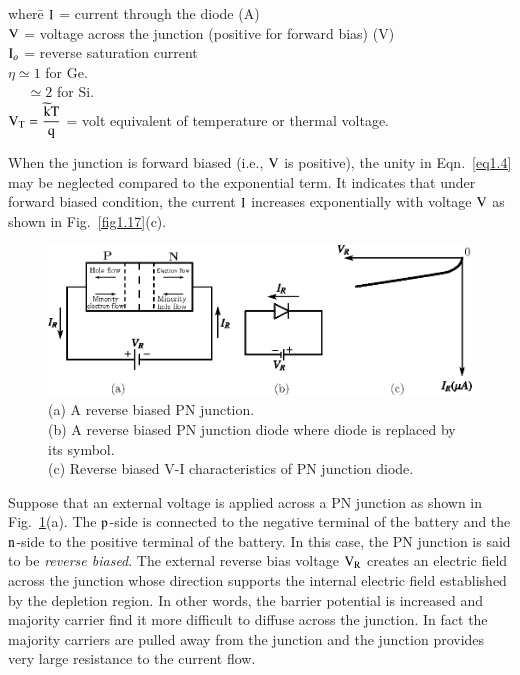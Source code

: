 \noindent
\begin{tabbing}
where\quad \= $\textrm{I}$ = current through the diode (A)\\[3pt]
           \> $\textrm{V}$ = voltage across the junction (positive for forward bias) (V)\\[3pt]
           \> $\textrm{I}_{o}$ = reverse saturation current\\[3pt]
           \> $\eta\simeq 1$ for Ge.\\[3pt]
           \> ~~ $\simeq 2$ for Si.\\[3pt]
           \> $\textrm{V}_{\textrm{T}}=\dfrac{\widetilde{\textrm{k}}\textrm{T}}{\textrm{q}}$ = volt equivalent of temperature or thermal voltage.
\end{tabbing}

When the junction is forward biased (i.e., $\textrm{V}$ is positive), the unity in Eqn.~\ref{eq1.4} may be neglected compared to the exponential term. It indicates that under forward biased condition, the current $\textrm{I}$ increases exponentially with voltage $\textrm{V}$ as shown in Fig.~\ref{fig1.17}(c).

\smallskip
{}
\begin{figure}[H]
\centering
\includegraphics{chap1/fig1.18.eps}
\caption{(a) A reverse biased PN junction.\\ (b) A reverse biased PN junction diode where diode is replaced by its symbol.\\ (c) Reverse biased V-I characteristics of PN junction diode.}\label{fig1.18}
\end{figure}

Suppose that an external voltage is applied across a PN junction as shown in Fig.~\ref{fig1.18}(a). The $\textrm{p}$-side is connected to the negative terminal of the battery and the $\textrm{n}$-side to the positive terminal of the battery. In this case, the PN junction is said to be {\em reverse biased}. The external reverse bias voltage $\textrm{V}_{\textrm{R}}$ creates an electric field across the junction whose direction supports the internal electric field established by the depletion region. In other words, the barrier potential is increased and majority carrier find it more difficult to diffuse across the junction. In fact the majority carriers are pulled away from the junction and the junction provides very large resistance to the current flow.

